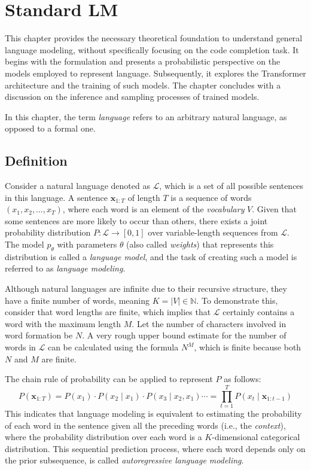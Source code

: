 \chapter{Standard LM}\label{chap:standard-lm}

This chapter provides the necessary theoretical foundation to understand general language modeling, without specifically focusing on the code completion task. It begins with the formulation and presents a probabilistic perspective on the models employed to represent language. Subsequently, it explores the Transformer architecture and the training of such models. The chapter concludes with a discussion on the inference and sampling processes of trained models.

In this chapter, the term \textit{language} refers to an arbitrary natural language, as opposed to a formal one.

\section{Definition}

Consider a natural language denoted as \(\mathcal{L}\), which is a set of all possible sentences in this language. A sentence \(\bm{x}_{1:T}\) of length \(T\) is a sequence of words \((x_1, x_2, \ldots, x_T)\), where each word is an element of the \textit{vocabulary} \(V\). Given that some sentences are more likely to occur than others, there exists a joint probability distribution \(P : \mathcal{L} \to [0, 1]\) over variable-length sequences from \(\mathcal{L}\). The model \(p_\theta\) with parameters \(\theta\) (also called \textit{weights}) that represents this distribution is called a \textit{language model}, and the task of creating such a model is referred to as \textit{language modeling}.

Although natural languages are infinite due to their recursive structure, they have a finite number of words, meaning \(K = |V| \in \mathbb{N}\). To demonstrate this, consider that word lengths are finite, which implies that \(\mathcal{L}\) certainly contains a word with the maximum length \(M\). Let the number of characters involved in word formation be \(N\). A very rough upper bound estimate for the number of words in \(\mathcal{L}\) can be calculated using the formula \(N^M\), which is finite because both \(N\) and \(M\) are finite.

The chain rule of probability can be applied to represent \(P\) as follows:
\begin{equation}\label{eq:probability-chain-rule}
    P(\bm{x}_{1:T}) = P(x_1) \cdot P(x_2 \mid x_1) \cdot P(x_3 \mid x_2, x_1) \cdots = \prod_{t=1}^{T}P(x_t \mid \bm{x}_{1:t-1})
\end{equation} 
This indicates that language modeling is equivalent to estimating the probability of each word in the sentence given all the preceding words (i.e., the \textit{context}), where the probability distribution over each word is a \(K\)-dimensional categorical distribution. This sequential prediction process, where each word depends only on the prior subsequence, is called \textit{autoregressive language modeling}.

